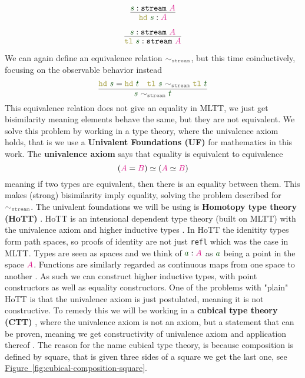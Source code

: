 \documentclass[twoside,11pt,openright]{report}
\theoremstyle{plain} %
\theoremstyle{definition}
\theoremstyle{remark}
\newcommand*{\figref}[1]{\hyperref[fig:#1]{Figure~\ref*{fig:#1}}}
\newcommand*{\term}[1]{\textcolor{green!30!black}{#1}} %
\newcommand*{\type}[1]{\textcolor{magenta!90!black}{#1}}
\newcommand*{\relation}[1]{\textcolor{gray!75!black}{\ensuremath{\mathtt{#1}}}}
\newcommand*{\destructor}[1]{\textcolor{yellow!60!black}{\ensuremath{\mathtt{#1}}}}
\newcommand*{\typeformer}[1]{\ensuremath{\mathtt{#1}}}
\begin{document}
\begin{center}
  \strut
  \hfill
  \begin{minipage}{0.225\linewidth}
    \begin{equation}
      \vcenter{\infer{\destructor{hd}~\term{s} : \type{A}}{\term{s} : \typeformer{stream}~\type{A}}}
    \end{equation}
  \end{minipage}
  \hfill
  \begin{minipage}{0.25\linewidth}
    \begin{equation}
      \vcenter{\infer{\destructor{tl}~\term{s}: \typeformer{stream}~\type{A}}{\term{s} : \typeformer{stream}~\type{A}}}
    \end{equation}
  \end{minipage}
  \hfill
  \strut
\end{center}
We can again define an equivalence relation \(\relation{\sim_{stream}}\), but this time coinductively, focusing on the observable behavior instead
\begin{equation}
  \label{eq:stream-bisimilarity}
  \vcenter{\infer{\term{s}~\relation{\sim_{stream}}~\term{t}}{\destructor{hd}~\term{s} = \destructor{hd}~\term{t} & \destructor{tl}~\term{s}~\relation{\sim_{stream}}~\destructor{tl}~\term{t}}}
\end{equation}
This equivalence relation does not give an equality in MLTT, we just get bisimilarity meaning elements behave the same, but they are not equivalent. We solve this problem by working in a type theory, where the univalence axiom holds, that is we use a \textbf{Univalent Foundations (UF)} for mathematics in this work. The \textbf{univalence axiom} says that equality is equivalent to equivalence
\begin{equation}
  (\type{A} = \type{B}) \simeq (\type{A} \simeq \type{B})
\end{equation}
meaning if two types are equivalent, then there is an equality between them. This makes (strong) bisimilarity imply equality, solving the problem described for \(\relation{\sim_{stream}}\). The univalent foundations we will be using is \textbf{Homotopy type theory (HoTT)} \cite{hottbook}. HoTT is an intensional dependent type theory (built on MLTT) with the univalence axiom and higher inductive types . In HoTT the idenitity types form path spaces, so proofs of identity are not just \texttt{refl} which was the case in MLTT. Types are seen as spaces and we think of \(\term{a} : \type{A}\) as \(\term{a}\) being a point in the space \(\type{A}\). Functions are similarly regarded as continuous maps from one space to another \cite{nlab:homotopy_type_theory}. As such we can construct higher inductive types, with point constructors as well as equality constructors. One of the problems with "plain" HoTT is that the univalence axiom is just postulated, meaning it is not constructive. To remedy this we will be working in a \textbf{cubical type theory (CTT)} \cite{DBLP:CTT}, where the univalence axiom is not an axiom, but a statement that can be proven, meaning we get constructivity of univalence axiom and application thereof \cite{nlab:cubical_type_theory}.  The reason for the name cubical type theory, is because composition is defined by square, that is given three sides of a square we get the last one, see \figref{cubical-composition-square}.
\end{document}
